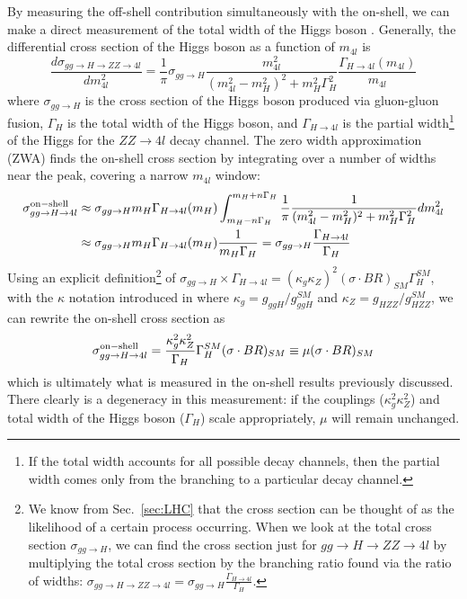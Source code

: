 By measuring the off-shell contribution simultaneously with the on-shell, we can make a direct measurement of the total width of the Higgs boson \cite{CaolaMelnikov:1307.4935}. Generally, the differential cross section of the Higgs boson as a function of $m_{4l}$ is 
\begin{equation}
\frac{d\sigma_{gg\rightarrow H\rightarrow ZZ\rightarrow 4l}}{dm^2_{4l}} = \frac{1}{\pi} \sigma_{gg\rightarrow H} \frac{m_{4l}^2}{(m_{4l}^2-m_{H}^2)^2+m_H^2\Gamma_{H}^2}\frac{\Gamma_{H\rightarrow 4l}(m_{4l})}{m_{4l}}
\label{eqn:DiffCrossSection}
\end{equation}
where $\sigma_{gg\rightarrow H}$ is the cross section of the Higgs boson produced via gluon-gluon fusion, $\Gamma_{H}$ is the total width of the Higgs boson, and $\Gamma_{H\rightarrow 4l}$ is the partial width\footnote{If the total width accounts for all possible decay channels, then the partial width comes only from the branching to a particular decay channel.} of the Higgs for the $ZZ\rightarrow 4l$ decay channel. The zero width approximation (ZWA) finds the on-shell cross section by integrating over a number of widths near the peak, covering a narrow $m_{4l}$ window:
\begin{equation}
\begin{split}
\sigma_{gg\rightarrow H\rightarrow 4l}^{\rm on-shell} &\approx \sigma_{gg\rightarrow H}m_{H}\Gamma_{H\rightarrow 4l}(m_{H})\int_{m_H-n\Gamma_H}^{m_H+n\Gamma_H} \frac{1}{\pi}\frac{1}{(m_{4l}^2-m_{H}^2)^2 + m_H^2\Gamma_H^2}dm_{4l}^2 \\
&\approx \sigma_{gg\rightarrow H}m_{H}\Gamma_{H\rightarrow 4l}(m_{H})\frac{1}{m_H\Gamma_H} = \sigma_{gg\rightarrow H}\frac{\Gamma_{H\rightarrow 4l}}{\Gamma_H}
\end{split}
\end{equation}
Using an explicit definition\footnote{We know from Sec.~\ref{sec:LHC} that the cross section can be thought of as the likelihood of a certain process occurring. When we look at the total cross section $\sigma_{gg\rightarrow H}$, we can find the cross section just for $gg \rightarrow H \rightarrow ZZ \rightarrow 4l$ by multiplying the total cross section by the branching ratio found via the ratio of widths: $\sigma_{gg\rightarrow H \rightarrow ZZ \rightarrow 4l} = \sigma_{gg\rightarrow H} \frac{\Gamma_{H \rightarrow 4l}}{\Gamma_{H}}$.} of $\sigma_{gg\rightarrow H}\times\Gamma_{H\rightarrow 4l} = \left(\kappa_g\kappa_Z\right)^2(\sigma\cdot BR)_{SM}\Gamma_{H}^{SM}$, with the $\kappa$ notation introduced in \cite{Higgs4lLegacy:2013} where $\kappa_g = g_{ggH}/g_{ggH}^{SM}$ and $\kappa_Z = g_{HZZ}/g_{HZZ}^{SM}$, we can rewrite the on-shell cross section as
\begin{equation}
\sigma_{gg\rightarrow H\rightarrow 4l}^{\rm on-shell} = \frac{\kappa_g^2\kappa_Z^2}{\Gamma_{H}}\Gamma_{H}^{SM}(\sigma\cdot BR)_{SM} \equiv \mu(\sigma\cdot BR)_{SM} 
\label{eqn:DiffCrossSection_OnShell}
\end{equation}
which is ultimately what is measured in the on-shell results previously discussed. There clearly is a degeneracy in this measurement: if the couplings ($\kappa_g^2\kappa_Z^2$) and total width of the Higgs boson ($\Gamma_H$) scale appropriately, $\mu$ will remain unchanged.

